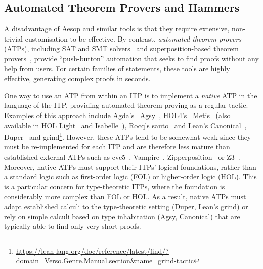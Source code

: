 \subsection{Automated Theorem Provers and Hammers}

A disadvantage of Aesop and similar tools is that they require extensive, non-trivial customisation to be effective.
By contrast, \emph{automated theorem provers} (ATPs), including SAT and SMT solvers~\cite{SATHandbook,Z3,CVC5} and superposition-based theorem provers~\cite{Vampire,Zipperposition}, provide \enquote{push-button} automation that seeks to find proofs without any help from users.
For certain families of statements, these tools are highly effective, generating complex proofs in seconds.

One way to use an ATP from within an ITP is to implement a \emph{native} ATP in the language of the ITP, providing automated theorem proving as a regular tactic.
Examples of this approach include Agda's~\cite{Agda} Agsy~\cite{Agsy}, HOL4's~\cite{HOL4} Metis~\cite{MetisHOL4} (also available in HOL Light~\cite{HOLLight,MetisHOLLight} and Isabelle~\cite{MetisIsabelle}), Rocq's sauto~\cite{sauto} and Lean's Canonical~\cite{Canonical}, Duper~\cite{Duper} and grind\footnote{\url{https://lean-lang.org/doc/reference/latest/find/?domain=Verso.Genre.Manual.section&name=grind-tactic}}.
However, these ATPs tend to be somewhat weak since they must be re-implemented for each ITP and are therefore less mature than established external ATPs such as cvc5~\cite{CVC5}, Vampire~\cite{Vampire}, Zipperposition~\cite{Zipperposition} or Z3~\cite{Z3}.
Moreover, native ATPs must support their ITPs' logical foundations, rather than a standard logic such as first-order logic (FOL) or higher-order logic (HOL).
This is a particular concern for type-theoretic ITPs, where the foundation is considerably more complex than FOL or HOL.
As a result, native ATPs must adapt established calculi to the type-theoretic setting (Duper, Lean's grind) or rely on simple calculi based on type inhabitation (Agsy, Canonical) that are typically able to find only very short proofs.

